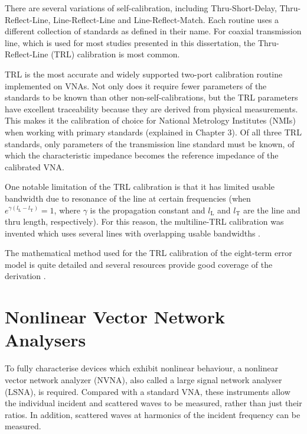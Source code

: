 \documentclass[../thesis/thesis.tex]{subfiles}
\begin{document}
\begin{refsection}
There are several variations of self-calibration, including Thru-Short-Delay, Thru-Reflect-Line, Line-Reflect-Line and Line-Reflect-Match. Each routine uses a different collection of standards as defined in their name. For coaxial transmission line, which is used for most studies presented in this dissertation, the Thru-Reflect-Line (TRL) calibration is most common.

TRL is the most accurate and widely supported two-port calibration routine implemented on VNAs. Not only does it require fewer parameters of the standards to be known than other non-self-calibrations, but the TRL parameters have excellent traceability because they are derived from physical measurements. This makes it the calibration of choice for National Metrology Institutes (NMIs) when working with primary standards (explained in Chapter 3). Of all three TRL standards, only parameters of the transmission line standard must be known, of which the characteristic impedance becomes the reference impedance of the calibrated VNA.

One notable limitation of the TRL calibration is that it has limited usable bandwidth due to resonance of the line at certain frequencies (when $e^{\gamma(l_\textrm{L}-l_\textrm{T})}=1$, where $\gamma$ is the propagation constant and $l_\textrm{L}$ and $l_\textrm{T}$ are the line and thru length, respectively). For this reason, the multiline-TRL calibration was invented which uses several lines with overlapping usable bandwidths \cite{Marks_1991}.

The mathematical method used for the TRL calibration of the eight-term error model is quite detailed and several resources provide good coverage of the derivation \cite{Engen_1979, Teppati_2013}.

\section{Nonlinear Vector Network Analysers}

To fully characterise devices which exhibit nonlinear behaviour, a nonlinear vector network analyzer (NVNA), also called a large signal network analyser (LSNA), is required. Compared with a standard VNA, these instruments allow the individual incident and scattered waves to be measured, rather than just their ratios. In addition, scattered waves at harmonics of the incident frequency can be measured.


\end{refsection}
\end{document}
